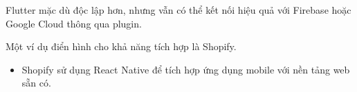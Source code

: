 \begin{flushleft}
    \begin{flushleft}
      \hspace*{0.8cm}Flutter mặc dù độc lập hơn, nhưng vẫn có thể kết nối hiệu quả với Firebase hoặc Google Cloud thông qua plugin.
    \end{flushleft}

    \begin{flushleft}
      \hspace*{0.8cm}Một ví dụ điển hình cho khả năng tích hợp là Shopify.
      \setlength{\leftmargini}{1.5cm}
      \begin{itemize}
          \item Shopify sử dụng React Native để tích hợp ứng dụng mobile với nền tảng web sẵn có.
      \end{itemize}
    \end{flushleft}

\end{flushleft}


